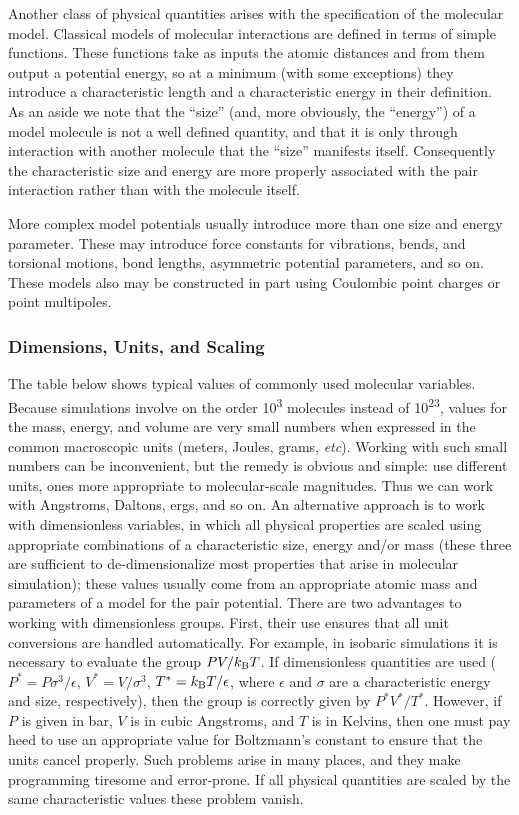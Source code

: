 \documentclass[]{article}
\begin{document}
Another class of physical quantities arises with the specification of
the molecular model. Classical models of molecular interactions are
defined in terms of simple functions. These functions take as inputs the
atomic distances and from them output a potential energy, so at a
minimum (with some exceptions) they introduce a characteristic length
and a characteristic energy in their definition. As an aside we note
that the ``size'' (and, more obviously, the ``energy'') of a model
molecule is not a well defined quantity, and that it is only through
interaction with another molecule that the ``size'' manifests itself.
Consequently the characteristic size and energy are more properly
associated with the pair interaction rather than with the molecule
itself.

More complex model potentials usually introduce more than one size and
energy parameter. These may introduce force constants for vibrations,
bends, and torsional motions, bond lengths, asymmetric potential
parameters, and so on. These models also may be constructed in part
using Coulombic point charges or point multipoles.

\subsubsection{Dimensions, Units, and
Scaling}\label{dimensions-units-and-scaling}

The table below shows typical values of commonly used
molecular variables. Because simulations involve on the order
10\textsuperscript{3} molecules instead of 10\textsuperscript{23},
values for the mass, energy, and volume are very small numbers when
expressed in the common macroscopic units (meters, Joules, grams,
\emph{etc}). Working with such small numbers can be inconvenient, but
the remedy is obvious and simple: use different units, ones more
appropriate to molecular-scale magnitudes. Thus we can work with
Angstroms, Daltons, ergs, and so on. An alternative approach is to work
with dimensionless variables, in which all physical properties are
scaled using appropriate combinations of a characteristic size, energy
and/or mass (these three are sufficient to de-dimensionalize most
properties that arise in molecular simulation); these values usually
come from an appropriate atomic mass and parameters of a model for the
pair potential. There are two advantages to working with dimensionless
groups. First, their use ensures that all unit conversions are handled
automatically. For example, in isobaric simulations it is necessary to
evaluate the group $PV/k_{\rm B}T$. If dimensionless quantities are used ($P^* =
P\sigma^3/\epsilon$, $V^* = V/\sigma^3$, $T^* = k_{\rm B}T/\epsilon$, where $\epsilon$
and $\sigma$ are a characteristic energy and size, respectively), then the
group is correctly given by $P^*V^*/T^*$. However, if $P$ is given in
bar, $V$ is in cubic Angstroms, and $T$ is in Kelvins, then one must
pay heed to use an appropriate value for Boltzmann's constant to ensure
that the units cancel properly. Such problems arise in many places, and
they make programming tiresome and error-prone. If all physical
quantities are scaled by the same characteristic values these problem
vanish.
\end{document}
